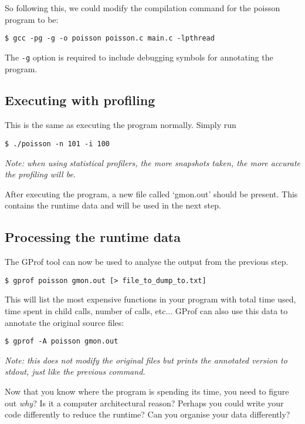 \documentclass[a4paper,11pt]{article}
\begin{document}
So following this, we could modify the compilation command for the poisson
program to be:
%
\begin{verbatim}
$ gcc -pg -g -o poisson poisson.c main.c -lpthread
\end{verbatim}
%
The \texttt{-g} option is required to include debugging symbols for annotating the program.


\subsection{Executing with profiling}

This is the same as executing the program normally. Simply run
\begin{verbatim}
$ ./poisson -n 101 -i 100
\end{verbatim}

\emph{Note: when using statistical profilers, the more snapshots taken, the more
accurate the profiling will be.}

After executing the program, a new file called `gmon.out' should be present.
This contains the runtime data and will be used in the next step.

\subsection{Processing the runtime data}

The GProf tool can now be used to analyse the output from the previous step.

\begin{verbatim}
$ gprof poisson gmon.out [> file_to_dump_to.txt]
\end{verbatim}

This will list the most expensive functions in your program with total time
used, time spent in child calls, number of calls, etc... GProf can also use this
data to annotate the original source files:

\begin{verbatim}
$ gprof -A poisson gmon.out
\end{verbatim}

\emph{Note: this does not modify the original files but prints the annotated
version to stdout, just like the previous command.}

Now that you know where the program is spending its time, you need to figure out
\emph{why}? Is it a computer architectural reason? Perhaps you could write your
code differently to reduce the runtime? Can you organise your data differently?
\end{document}
